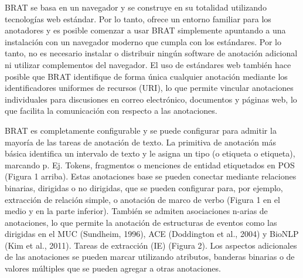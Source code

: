 BRAT se basa en un navegador y se construye en su totalidad utilizando tecnologías web estándar. Por lo tanto, ofrece un entorno familiar para los anotadores y es posible comenzar a usar BRAT simplemente apuntando a una instalación con un navegador moderno que cumpla con los estándares. Por lo tanto, no es necesario instalar o distribuir ningún software de anotación adicional ni utilizar complementos del navegador. El uso de estándares web también hace posible que BRAT identifique de forma única cualquier anotación mediante los identificadores uniformes de recursos (URI), lo que permite vincular anotaciones individuales para discusiones en correo electrónico, documentos y páginas web, lo que facilita la comunicación con respecto a las anotaciones.

BRAT es completamente configurable y se puede configurar para admitir la mayoría de las tareas de anotación de texto. La primitiva de anotación más básica identifica un intervalo de texto y le asigna un tipo (o etiqueta o etiqueta), marcando p. Ej. Tokens, fragmentos o menciones de entidad etiquetados en POS (Figura 1 arriba). Estas anotaciones base se pueden conectar mediante relaciones binarias, dirigidas o no dirigidas, que se pueden configurar para, por ejemplo, extracción de relación simple, o anotación de marco de verbo (Figura 1 en el medio y en la parte inferior). También se admiten asociaciones n-arias de anotaciones, lo que permite la anotación de estructuras de eventos como las dirigidas en el MUC (Sundheim, 1996), ACE (Doddington et al., 2004) y BioNLP (Kim et al., 2011). Tareas de extracción (IE) (Figura 2). Los aspectos adicionales de las anotaciones se pueden marcar utilizando atributos, banderas binarias o de valores múltiples que se pueden agregar a otras anotaciones.

